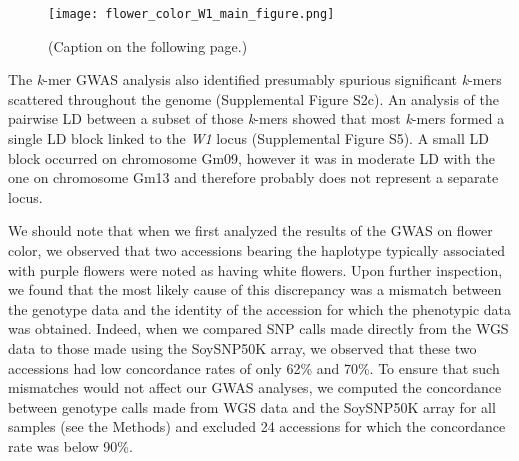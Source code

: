 \documentclass{article}
\begin{document}
\begin{figure}
	\centering
	\texttt{[image: flower\_color\_W1\_main\_figure.png]}
	\caption{(Caption on the following page.)}
	\label{flower-color-main-figure}
\end{figure}

\begin{figure}
\end{figure}

The \textit{k}-mer GWAS analysis also identified presumably spurious significant
\textit{k}-mers scattered throughout the genome (Supplemental Figure
S2c). An analysis of the pairwise LD between a subset
of those \textit{k}-mers showed that most \textit{k}-mers formed a single LD block
linked to the \textit{W1} locus (Supplemental Figure S5). A small LD block
occurred on chromosome Gm09, however it was in moderate LD with the one on chromosome
Gm13 and therefore probably does not represent a separate locus.

We should note that when we first analyzed the results of the GWAS on flower
color, we observed that two accessions bearing the haplotype typically
associated with purple flowers were noted as having white flowers. Upon further
inspection, we found that the most likely cause of this discrepancy was a
mismatch between the genotype data and the identity of the accession for which
the phenotypic data was obtained. Indeed, when we compared SNP calls made
directly from the WGS data to those made using the SoySNP50K array, we observed
that these two accessions had low concordance rates of only 62\% and 70\%. To
ensure that such mismatches would not affect our GWAS analyses, we computed the
concordance between genotype calls made from WGS data and the SoySNP50K array
for all samples (see the Methods) and excluded 24 accessions for which the
concordance rate was below 90\%.
\end{document}
